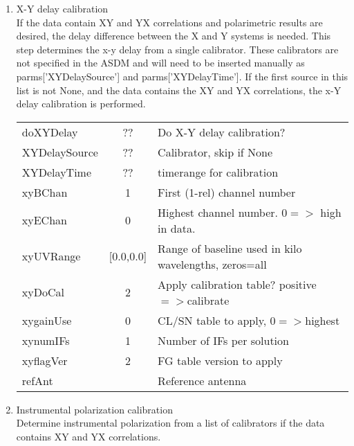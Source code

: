 \documentclass[11pt]{article}
\begin{document}
\begin{enumerate}
\begin{center}
\begin{tabular}{|l|c|l|}
\hline
\end{tabular}
\end{center}
%
\item X-Y  delay calibration\\
If the data contain XY and YX correlations and polarimetric results
are desired, the delay difference between the X and Y systems is needed.
This step determines the x-y delay from a single calibrator.
These calibrators are not specified in the ASDM and will need to be
inserted manually as parms['XYDelaySource'] and  parms['XYDelayTime'].
If the first source in this list is not None, and the data contains
the XY and YX correlations, the x-Y delay calibration is performed. \\
\begin{center}
\begin{tabular}{|l|c|l|}
\hline
doXYDelay   & ?? &  Do X-Y delay calibration?\\
XYDelaySource & ?? &  Calibrator, skip if None \\
XYDelayTime   & ?? &  timerange for calibration \\
xyBChan     & 1            & First (1-rel) channel number\\
xyEChan     & 0            & Highest channel number. $0=>$ high in data. \\
xyUVRange   &  [0.0,0.0]   & Range of baseline used in kilo wavelengths, zeros=all\\
xyDoCal     & 2            & Apply calibration table? positive$=>$calibrate\\
xygainUse   & 0            & CL/SN table to apply, $0=>$highest\\
xynumIFs    & 1            & Number of IFs per solution \\
xyflagVer   & 2            & FG table version to apply \\
refAnt      &              & Reference antenna \\
\hline
\end{tabular}
\end{center}
%
\item Instrumental polarization calibration \label{polcal} \\
Determine instrumental polarization from a list of calibrators if the data
contains XY and YX correlations.

\end{enumerate}
\end{document}
